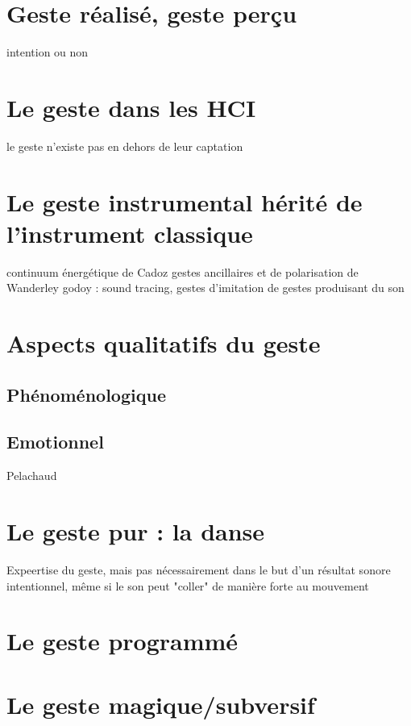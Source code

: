 \section{Geste réalisé, geste perçu}
intention ou non


\section{Le geste dans les HCI}
	le geste n'existe pas en dehors de leur captation  

\section{Le geste instrumental hérité de l'instrument classique}
	continuum énergétique de Cadoz
	gestes ancillaires et de polarisation de Wanderley
	godoy : sound tracing, gestes d'imitation de gestes produisant du son

\section{Aspects qualitatifs du geste}
	\subsection{Phénoménologique}
	\subsection{Emotionnel}

Pelachaud 

\section{Le geste pur : la danse}
Expeertise du geste, mais pas nécessairement dans le but d'un résultat sonore intentionnel, même si le son peut "coller" de manière forte au mouvement


\section{Le geste programmé}


\section{Le geste magique/subversif}

\cite{cadoz_synthese_1981}

\cite{gibet_codage_1987}

